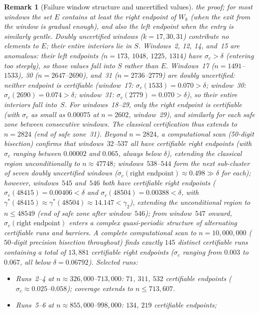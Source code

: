 \documentclass[11pt]{article}
\newtheorem{remark}[theorem]{Remark}
\begin{document}
\begin{remark}[Failure window structure and uncertified values]
the proof; for most windows the set $E$ contains at least the right endpoint of $W_k$
(when the exit from the window is gradual enough), and also the left endpoint when the
entry is similarly gentle. Doubly uncertified windows ($k = 17, 30, 31$) contribute
no elements to $E$; their entire interiors lie in $S$.
Windows~2, 12, 14, and~15 are \emph{anomalous}: their left endpoints ($n=173$, $1048$, $1225$, $1314$)
have $\sigma_c > \delta$ (entering too steeply), so those values fall into $S$ rather than $E$.
Windows~17 ($n=1491$--$1533$), 30 ($n=2647$--$2690$), and~31 ($n=2736$--$2779$)
are \emph{doubly uncertified}: neither endpoint is certifiable
(window~17: $\sigma_c(1533) = 0.070 > \delta$;
window~30: $\sigma_c(2690) = 0.074 > \delta$;
window~31: $\sigma_c(2779) = 0.070 > \delta$),
so their entire interiors fall into~$S$.
For windows~18--29, only the right endpoint is certifiable (with $\sigma_c$ as small as $0.00075$
at $n=2602$, window~29), and similarly for each safe zone between consecutive windows.
The classical certification thus extends to $n=2824$ (end of safe zone~31).
Beyond $n=2824$, a computational scan (50-digit bisection) confirms that windows~$32$--$537$
\emph{all} have certifiable right endpoints (with $\sigma_c$ ranging between $0.00002$ and $0.065$,
always below $\delta$), extending the classical region unconditionally to $n \approx 47748$;
windows~$538$--$544$ form the next sub-cluster of seven doubly uncertified windows
($\sigma_c(\text{right endpoint}) \approx 0.498 \gg \delta$ for each);
however, windows~$545$ and~$546$ both have certifiable right endpoints
($\sigma_c(48415) = 0.00406 < \delta$ and $\sigma_c(48504) = 0.00388 < \delta$,
with $\gamma^*(48415) \approx \gamma^*(48504) \approx 14.147 < \gamma_2$),
extending the unconditional region to $n \leq 48549$ (end of safe zone after window~$546$);
from window~$547$ onward, $\sigma_c(\text{right endpoint})$ enters a complex quasi-periodic structure
of alternating certifiable runs and barriers.
A complete computational scan to $n = 10{,}000{,}000$ ($50$-digit precision bisection throughout)
finds exactly $145$ distinct certifiable runs containing a total of $13{,}881$ certifiable right endpoints
($\sigma_c$ ranging from $0.003$ to $0.067$, all below $\delta = 0.06792$).
Selected runs:
\begin{itemize}
\item Runs~2--4 at $n \approx 326{,}000$--$713{,}000$: $71$, $311$, $532$ certifiable endpoints
  ($\sigma_c \approx 0.025$--$0.058$); coverage extends to $n \leq 713{,}607$.
\item Runs~5--6 at $n \approx 855{,}000$--$998{,}000$: $134$, $219$ certifiable endpoints;

\end{itemize}
\end{remark}
\end{document}
